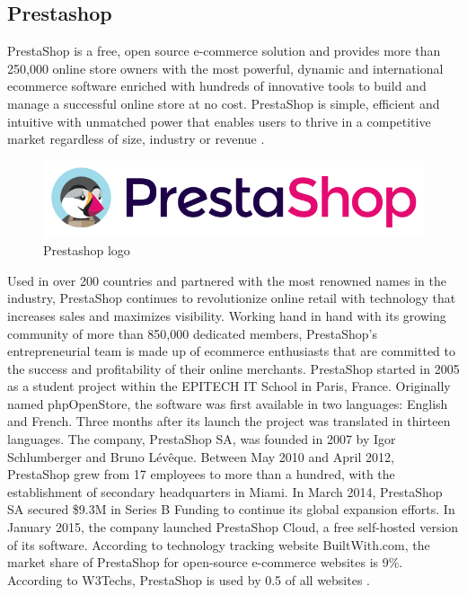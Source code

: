 \subsection{Prestashop}
PrestaShop is a free, open source e-commerce solution and provides more than 250,000 online store owners with the most powerful, dynamic and international ecommerce software enriched with hundreds of innovative tools to build and manage a successful online store at no cost. PrestaShop is simple, efficient and intuitive with unmatched power that enables users to thrive in a competitive market regardless of size, industry or revenue \cite{prestashop_overview}.
\begin{figure}[htb]
  \centering
  \includegraphics[width=0.5\linewidth]{images/chapter1/prestashop_logo.png}\hfill
  \caption[Prestashop logo]{Prestashop logo}
  \label{fig:ebay_logo}
\end{figure}
Used in over 200 countries and partnered with the most renowned names in the industry, PrestaShop continues to revolutionize online retail with technology that increases sales and maximizes visibility. Working hand in hand with its growing community of more than 850,000 dedicated members, PrestaShop’s entrepreneurial team is made up of ecommerce enthusiasts that are committed to the success and profitability of their online merchants.
\newline
PrestaShop started in 2005 as a student project within the EPITECH IT School in Paris, France. Originally named phpOpenStore, the software was first available in two languages: English and French. Three months after its launch the project was translated in thirteen languages.
The company, PrestaShop SA, was founded in 2007 by Igor Schlumberger and Bruno Lévêque. Between May 2010 and April 2012, PrestaShop grew from 17 employees to more than a hundred, with the establishment of secondary headquarters in Miami. In March 2014, PrestaShop SA secured \$9.3M in Series B Funding to continue its global expansion efforts. In January 2015, the company launched PrestaShop Cloud, a free self-hosted version of its software. According to technology tracking website BuiltWith.com, the market share of PrestaShop for open-source e-commerce websites is 9\%. According to W3Techs, PrestaShop is used by 0.5 of all websites \cite{prestashop_history}.

